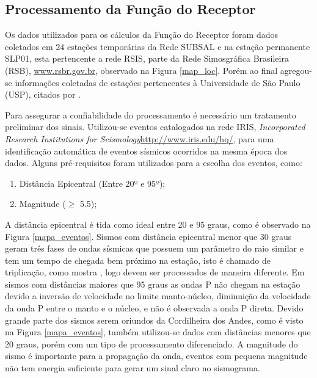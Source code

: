 \subsection{Processamento da Função do Receptor}

Os dados utilizados para os cálculos da Função do Receptor foram dados coletados em 24 estações temporárias da Rede SUBSAL e na estação permanente SLP01, esta pertencente a rede RSIS, parte da Rede Simosgráfica Brasileira (RSB), \url{www.rsbr.gov.br}, observado na Figura \ref{map_loc}. Porém ao final agregou-se informações coletadas de estações pertencentes à Universidade de São Paulo (USP), citados por \cite{Assumpcao_Brazil_2013}. 

Para assegurar a confiabilidade do processamento é necessário um tratamento preliminar dos sinais. Utilizou-se eventos catalogados na rede IRIS, \textit{Incorporated Research Institutions for Seismology}\url{http://www.iris.edu/hq/}, para uma identificação automática de eventos sísmicos ocorridos na mesma época dos dados. Alguns pré-requisitos foram utilizados para a escolha dos eventos, como:

\begin{enumerate}
\item Distância Epicentral (Entre 20º e 95º);
\item Magnitude ($\geq$ 5.5);
\end{enumerate}

A distância epicentral é tida como ideal entre 20 e 95 graus, como é observado na Figura \ref{mapa_eventos}. Sismos com distância epicentral menor que 30 graus geram três fases de ondas sísmicas que possuem um parâmetro do raio similar e tem um tempo de chegada bem próximo na estação, isto é chamado de triplicação, como mostra \cite{stahler_triplicated_2012}, logo devem ser processados de maneira diferente. Em sismos com distâncias maiores que 95 graus as ondas P não chegam na estação devido a inversão de velocidade no limite manto-núcleo, diminuição da velocidade da onda P entre o manto e o núcleo, e não é observada a onda P direta. Devido grande parte dos sismos serem oriundos da Cordilheira dos Andes, como é visto na Figura \ref{mapa_eventos}, também utilizou-se dados com distâncias menores que 20 graus, porém com um tipo de processamento diferenciado. A magnitude do sismo é importante para a propagação da onda, eventos com pequena magnitude não tem energia suficiente para gerar um sinal claro no sismograma.

